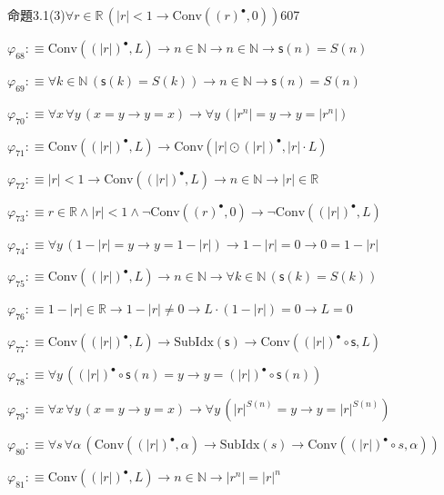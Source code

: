 \begin{fullproof}{命題3.1(3)}{$\forall r \in \mathbb{R}\,(\lvert r \rvert < 1 \to \mathrm{Conv}({(r)^{\bullet}},0))$}{607}
\begin{abbrevlist}
\item $\varphi_{68} :\equiv \mathrm{Conv}({(\lvert r \rvert)^{\bullet}},L) \to n \in \mathbb{N} \to n \in \mathbb{N} \to \mathsf{s}(n) = S(n)$
\item $\varphi_{69} :\equiv \forall k \in \mathbb{N}\,(\mathsf{s}(k) = S(k)) \to n \in \mathbb{N} \to \mathsf{s}(n) = S(n)$
\item $\varphi_{70} :\equiv \forall x\,\forall y\,(x = y \to y = x) \to \forall y\,(\lvert {{r}^{n}} \rvert = y \to y = \lvert {{r}^{n}} \rvert)$
\item $\varphi_{71} :\equiv \mathrm{Conv}({(\lvert r \rvert)^{\bullet}},L) \to \mathrm{Conv}(\lvert r \rvert \odot {(\lvert r \rvert)^{\bullet}},\lvert r \rvert \cdot L)$
\item $\varphi_{72} :\equiv \lvert r \rvert < 1 \to \mathrm{Conv}({(\lvert r \rvert)^{\bullet}},L) \to n \in \mathbb{N} \to \lvert r \rvert \in \mathbb{R}$
\item $\varphi_{73} :\equiv r \in \mathbb{R} \land \lvert r \rvert < 1 \land \neg \mathrm{Conv}({(r)^{\bullet}},0) \to \neg \mathrm{Conv}({(\lvert r \rvert)^{\bullet}},L)$
\item $\varphi_{74} :\equiv \forall y\,(1 - \lvert r \rvert = y \to y = 1 - \lvert r \rvert) \to 1 - \lvert r \rvert = 0 \to 0 = 1 - \lvert r \rvert$
\item $\varphi_{75} :\equiv \mathrm{Conv}({(\lvert r \rvert)^{\bullet}},L) \to n \in \mathbb{N} \to \forall k \in \mathbb{N}\,(\mathsf{s}(k) = S(k))$
\item $\varphi_{76} :\equiv 1 - \lvert r \rvert \in \mathbb{R} \to 1 - \lvert r \rvert \neq 0 \to L \cdot (1 - \lvert r \rvert) = 0 \to L = 0$
\item $\varphi_{77} :\equiv \mathrm{Conv}({(\lvert r \rvert)^{\bullet}},L) \to \mathrm{SubIdx}(\mathsf{s}) \to \mathrm{Conv}({(\lvert r \rvert)^{\bullet}} \circ \mathsf{s},L)$
\item $\varphi_{78} :\equiv \forall y\,({(\lvert r \rvert)^{\bullet}} \circ \mathsf{s}(n) = y \to y = {(\lvert r \rvert)^{\bullet}} \circ \mathsf{s}(n))$
\item $\varphi_{79} :\equiv \forall x\,\forall y\,(x = y \to y = x) \to \forall y\,({{\lvert r \rvert}^{S(n)}} = y \to y = {{\lvert r \rvert}^{S(n)}})$
\item $\varphi_{80} :\equiv \forall s\,\forall \alpha\,(\mathrm{Conv}({(\lvert r \rvert)^{\bullet}},\alpha) \to \mathrm{SubIdx}(s) \to \mathrm{Conv}({(\lvert r \rvert)^{\bullet}} \circ s,\alpha))$
\item $\varphi_{81} :\equiv \mathrm{Conv}({(\lvert r \rvert)^{\bullet}},L) \to n \in \mathbb{N} \to \lvert {{r}^{n}} \rvert = {{\lvert r \rvert}^{n}}$

\end{abbrevlist}
\end{fullproof}
